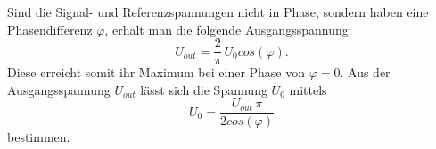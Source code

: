 \noindent Sind die Signal- und Referenzspannungen nicht in Phase, sondern haben eine 
Phasendifferenz $\varphi$, erhält man die folgende Ausgangsspannung: 
\begin{equation}
    U_{out} = \frac{2}{\pi}\, U_{0} cos(\varphi).
    \label{eqn:u_out}
\end{equation}
Diese erreicht somit ihr Maximum bei einer Phase von $\varphi = 0$.
Aus der Ausgangsspannung $U_{out}$ lässt sich die Spannung $U_{0}$ mittels
\begin{equation}
    U_{0} = \frac{U_{out}\, \pi}{2 cos(\varphi)} %
    \label{eqn:u_0}
\end{equation}
bestimmen.
